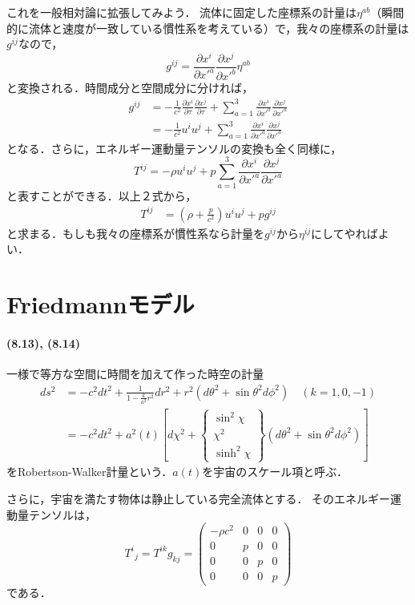 \documentclass[a4paper]{ltjsreport}
\begin{document}
これを一般相対論に拡張してみよう．
流体に固定した座標系の計量は$\eta^{ab}$（瞬間的に流体と速度が一致している慣性系を考えている）で，我々の座標系の計量は$g^{ij}$なので，
\[g^{ij}=\frac{\partial{x^i}}{\partial{x'^a}}\frac{\partial{x^j}}{\partial{x'^b}}\eta^{ab}\]
と変換される．時間成分と空間成分に分ければ，
\begin{align*}
  g^{ij} &=  - \frac{1}{c^2}\frac{\partial{x^i}}{\partial{\tau}}\frac{\partial{x^j}}{\partial{\tau}} + \sum_{a=1}^{3}\frac{\partial{x^i}}{\partial{x'^a}}\frac{\partial{x^j}}{\partial{x'^a}}\\
  &=  - \frac{1}{c^2}u^iu^j + \sum_{a=1}^{3}\frac{\partial{x^i}}{\partial{x'^a}}\frac{\partial{x^j}}{\partial{x'^a}}
\end{align*}
となる．さらに，エネルギー運動量テンソルの変換も全く同様に，
\[T^{ij}= - \rho{}u^iu^j + p\sum_{a=1}^{3}\frac{\partial{x^i}}{\partial{x'^a}}\frac{\partial{x^j}}{\partial{x'^a}}\]
と表すことができる．以上２式から，
\begin{align}
  T^{ij} &= \left(\rho + \frac{p}{c^2}\right)u^iu^j + pg^{ij}
\end{align}
と求まる．もしも我々の座標系が慣性系なら計量を$g^{ij}$から$\eta^{ij}$にしてやればよい．

\section{Friedmannモデル}
\paragraph{(8.13), (8.14)}
一様で等方な空間に時間を加えて作った時空の計量
\begin{align*}
  ds^2 &= -  c^2dt^2 + \frac{1}{1 - \frac{k}{a^2}r^2}dr^2 + r^2(d\theta^2 + \sin\theta^2d\phi^2)\quad(k=1, 0, -  1)\\
  &= -  c^2dt^2 + a^2(t)[d\chi^2 + \left.
  \begin{cases}
    \sin^2\chi\\
    \chi^2\\
    \sinh^2\chi
  \end{cases}
  \right\}(d\theta^2 + \sin\theta^2d\phi^2)]
\end{align*}
をRobertson-Walker計量という．$a(t)$を宇宙のスケール項と呼ぶ．

さらに，宇宙を満たす物体は静止している完全流体とする．
そのエネルギー運動量テンソルは，
\[
{T^i}_j=T^{ik}g_{kj}=
\begin{pmatrix}
  - \rho{c^2} & 0 & 0 & 0\\
  0 & p & 0 & 0\\
  0 & 0 & p & 0\\
  0 & 0 & 0 & p
\end{pmatrix}
\]
である．
\end{document}
